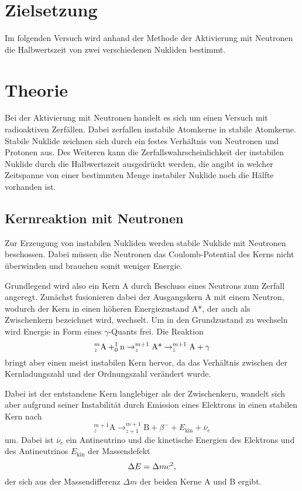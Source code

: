\section{Zielsetzung}
Im folgenden Versuch wird anhand der Methode der Aktivierung mit Neutronen die Halbwertszeit von zwei verschiedenen Nukliden bestimmt.

\section{Theorie}
Bei der Aktivierung mit Neutronen handelt es sich um einen Versuch mit radioaktiven Zerfällen.
Dabei zerfallen instabile Atomkerne in stabile Atomkerne. 
Stabile Nuklide zeichnen sich durch ein festes Verhältnis von Neutronen und Protonen aus.
Des Weiteren kann die Zerfallswahrscheinlichkeit der instabilen Nuklide durch die Halbwertszeit ausgedrückt werden, die angibt in welcher Zeitspanne von einer bestimmten Menge instabiler Nuklide noch die Hälfte vorhanden ist.

\subsection{Kernreaktion mit Neutronen}
Zur Erzeugung von instabilen Nukliden werden stabile Nuklide mit Neutronen beschossen.
Dabei müssen die Neutronen das Coulomb-Potential des Kerns nicht überwinden und brauchen somit weniger Energie.
 
Grundlegend wird also ein Kern A durch Beschuss eines Neutrons zum Zerfall angeregt.
Zunächst fusionieren dabei der Ausgangskern A mit einem Neutron, wodurch der Kern in einen höheren Energiezustand A*, der auch als Zwischenkern bezeichnet wird, wechselt.
Um in den Grundzustand zu wechseln wird Energie in Form eines $\gamma$-Quants frei.
Die Reaktion
\begin{equation}
    \label{eq:1}
    _{z}^{m} \text{A} + _{0}^{1} \text{n} \rightarrow _{z}^{m+1} \text{A*} \rightarrow _{z}^{m+1} \text{A} + \gamma \notag
\end{equation}
bringt aber einen meist instabilen Kern hervor, da das Verhältnis zwischen der Kernladungszahl und der Ordnungszahl verändert wurde.

Dabei ist der entstandene Kern langlebiger als der Zwischenkern, wandelt sich aber aufgrund seiner Instabilität durch Emission eines Elektrons in einen stabilen Kern nach
\begin{equation}
    \label{eq:2}
    _{z}^{m+1} \text{A} \rightarrow _{z+1}^{m+1} \text{B} + \beta^{-} + E_\text{kin} + \overline{\nu}_e 
\end{equation}
um. Dabei ist $\overline{\nu}_e$ ein Antineutrino und die kinetische Energien des Elektrons und des Antineutrinos $E_\text{kin}$ der Massendefekt
\begin{equation}
  \Delta E = \Delta m c^2, \notag
\end{equation}
der sich aus der Massendifferenz $\Delta m$ der beiden Kerne A und B ergibt.

